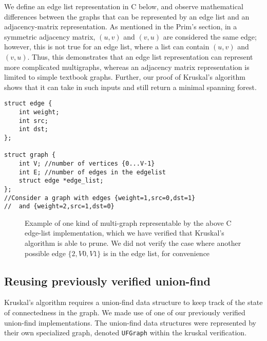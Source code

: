We define an edge list representation in C below, and observe mathematical differences between the graphs that can be represented by an edge list and an adjacency-matrix representation. As mentioned in the Prim's section, in a symmetric adjacency matrix, $(u,v)$ and $(v,u)$ are considered the same edge; however, this is not true for an edge list, where a list can contain $(u,v)$ and $(v,u)$. Thus, this demonstrates that an edge list representation can represent more complicated multigraphs, whereas an adjacency matrix representation is limited to simple textbook graphs. Further, our proof of Kruskal's algorithm shows that it can take in such inputs and still return a minimal spanning forest.
\newline
\begin{lstlisting}
struct edge {
	int weight;
	int src;
	int dst;
};

struct graph {
	int V; //number of vertices {0...V-1}
	int E; //number of edges in the edgelist
	struct edge *edge_list;
};
//Consider a graph with edges {weight=1,src=0,dst=1}
//	and {weight=2,src=1,dst=0}
\end{lstlisting}
\begin{figure}
\caption{Example of one kind of multi-graph representable by the above C edge-list implementation, which we have verified that Kruskal's algorithm is able to prune. We did not verify the case where another possible edge $\{2,V0,V1\}$ is in the edge list, for convenience}
\end{figure}

\subsection{Reusing previously verified union-find} %
Kruskal's algorithm requires a union-find data structure to keep track of the state of connectedness in the graph. We made use of one of our previously verified union-find implementations. The union-find data structures were represented by their own specialized graph, denoted \texttt{UFGraph} within the kruskal verification.

